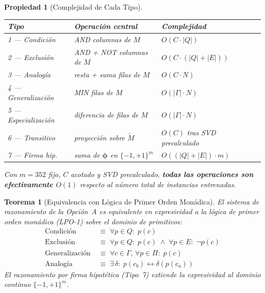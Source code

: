 \documentclass[12pt]{article}
\newtheorem{theorem}{Teorema}[section]
\newtheorem{property}{Propiedad}[section]
\begin{document}
\begin{property}[Complejidad de Cada Tipo]
	\begin{center}
		\begin{tabular}{llll}
			\toprule
			\textbf{Tipo} & \textbf{Operación central} & \textbf{Complejidad} \\
			\midrule
			1 — Condición    & AND columnas de $M$            & $O(C \cdot |Q|)$            \\
			2 — Exclusión    & AND + NOT columnas de $M$      & $O(C \cdot (|Q|+|E|))$      \\
			3 — Analogía     & resta + suma filas de $M$      & $O(C \cdot N)$              \\
			4 — Generalización & MIN filas de $M$             & $O(|\Gamma| \cdot N)$       \\
			5 — Especialización & diferencia de filas de $M$  & $O(|\Gamma| \cdot N)$       \\
			6 — Transitivo   & proyección sobre $\tilde{M}$   & $O(C)$ tras SVD precalculado\\
			7 — Firma hip.   & suma de $\bm{\phi}$ en $\{-1,+1\}^m$ & $O((|Q|+|E|)\cdot m)$ \\
			\bottomrule
		\end{tabular}
	\end{center}
	Con $m=352$ fijo, $C$ acotado y SVD precalculado, \textbf{todas las operaciones
		son efectivamente $O(1)$} respecto al número total de instancias entrenadas.
\end{property}

\begin{theorem}[Equivalencia con Lógica de Primer Orden Monádica]
	El sistema de razonamiento de la Opción~A es equivalente en expresividad a la
	lógica de primer orden monádica (LPO-1) sobre el dominio de primitivos:
	\begin{align*}
		\text{Condición} &\;\equiv\; \forall p \in Q:\; p(c) \\
		\text{Exclusión} &\;\equiv\; \forall p \in Q:\; p(c) \;\wedge\;
		\forall p \in E:\; \neg p(c) \\
		\text{Generalización} &\;\equiv\; \forall c \in \Gamma,\,\forall p \in \Pi:
		\; p(c) \\
		\text{Analogía} &\;\equiv\; \exists\,\delta:\;
		p(c_b) \leftrightarrow \delta(p(c_a))
	\end{align*}
	El razonamiento por firma hipotética (Tipo~7) extiende la expresividad al
	dominio continuo $\{-1,+1\}^m$.
\end{theorem}
\end{document}
